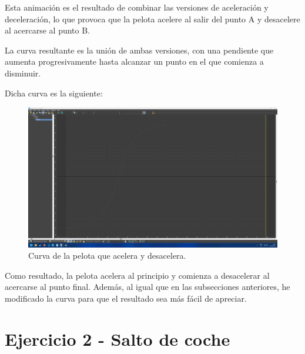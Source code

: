 \documentclass{article}
\begin{document}
{%

Esta animación es el resultado de combinar las versiones de aceleración y deceleración, lo que provoca que la pelota acelere al salir del punto A y desacelere al acercarse al punto B.


La curva resultante es la unión de ambas versiones, con una pendiente que aumenta progresivamente hasta alcanzar un punto en el que comienza a disminuir.

Dicha curva es la siguiente:

\begin{figure}[H]
    \centering
    \includegraphics[width=\textwidth]{imagenes/Ejercicio 1/curvas/aceldecel.png}
    \caption{Curva de la pelota que acelera y desacelera.}
\end{figure}


Como resultado, la pelota acelera al principio y comienza a desacelerar al acercarse al punto final. Además, al igual que en las subsecciones anteriores, he modificado la curva para que el resultado sea más fácil de apreciar.



\section{Ejercicio 2 - Salto de coche}

}
\end{document}

